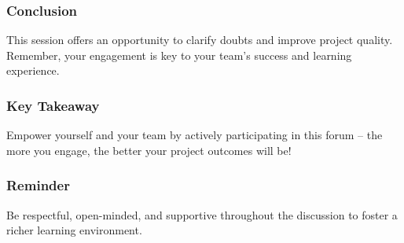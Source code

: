 \documentclass{beamer}
\begin{document}
\begin{frame}[fragile]
    \frametitle{Conclusion}
    This session offers an opportunity to clarify doubts and improve project quality. Remember, your engagement is key to your team’s success and learning experience.
\end{frame}

\begin{frame}[fragile]
    \frametitle{Key Takeaway}
    Empower yourself and your team by actively participating in this forum – the more you engage, the better your project outcomes will be!
\end{frame}

\begin{frame}[fragile]
    \frametitle{Reminder}
    Be respectful, open-minded, and supportive throughout the discussion to foster a richer learning environment.
\end{frame}
\end{document}
